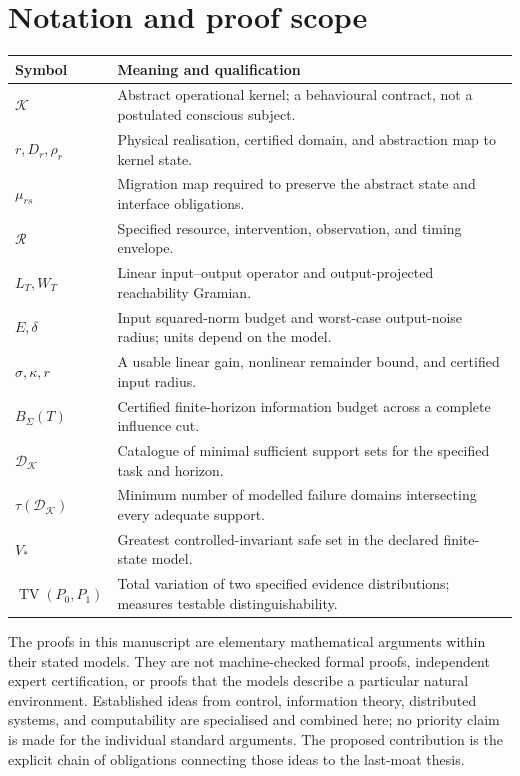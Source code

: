 \documentclass[11pt,a4paper]{article}
\theoremstyle{definition}
\theoremstyle{remark}
\newcommand{\calR}{\mathcal{R}}
\newcommand{\calK}{\mathcal{K}}
\DeclareMathOperator{\TV}{TV}
\begin{document}
\section{Notation and proof scope}\label{app:notation}
\begin{longtable}{@{}>{\raggedright\arraybackslash}p{}>{\raggedright\arraybackslash}p{}@{}}
\toprule
Symbol & Meaning and qualification\\
\midrule
\endhead
$\calK$ & Abstract operational kernel; a behavioural contract, not a postulated conscious subject.\\
$r,D_r,\rho_r$ & Physical realisation, certified domain, and abstraction map to kernel state.\\
$\mu_{rs}$ & Migration map required to preserve the abstract state and interface obligations.\\
$\calR$ & Specified resource, intervention, observation, and timing envelope.\\
$L_T,W_T$ & Linear input--output operator and output-projected reachability Gramian.\\
$E,\delta$ & Input squared-norm budget and worst-case output-noise radius; units depend on the model.\\
$\sigma,\kappa,r$ & A usable linear gain, nonlinear remainder bound, and certified input radius.\\
$B_\Sigma(T)$ & Certified finite-horizon information budget across a complete influence cut.\\
$\mathscr D_{\calK}$ & Catalogue of minimal sufficient support sets for the specified task and horizon.\\
$\tau(\mathscr D_{\calK})$ & Minimum number of modelled failure domains intersecting every adequate support.\\
$V_*$ & Greatest controlled-invariant safe set in the declared finite-state model.\\
$\TV(P_0,P_1)$ & Total variation of two specified evidence distributions; measures testable distinguishability.\\
\bottomrule
\end{longtable}

The proofs in this manuscript are elementary mathematical arguments within their stated models. They are not machine-checked formal proofs, independent expert certification, or proofs that the models describe a particular natural environment. Established ideas from control, information theory, distributed systems, and computability are specialised and combined here; no priority claim is made for the individual standard arguments. The proposed contribution is the explicit chain of obligations connecting those ideas to the last-moat thesis.
\end{document}

